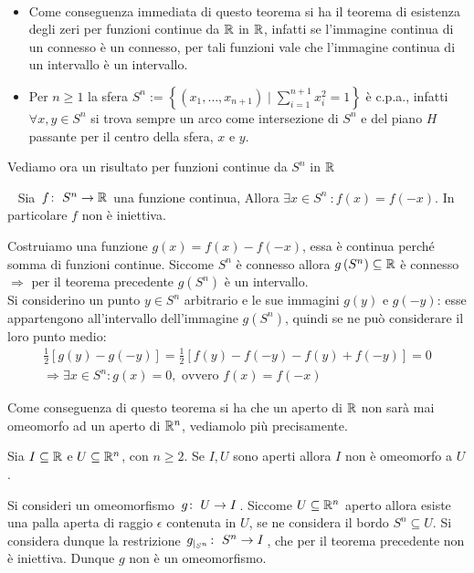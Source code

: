 \begin{observe}~{}\label{teorema esistenza zeri funzioni continue, s^n cpa}
		\begin{itemize}
	\item Come conseguenza immediata di questo teorema si ha il teorema di esistenza degli zeri per funzioni continue da $\mathbb{R}$ in $\mathbb{R}$, infatti se l'immagine continua di un connesso è un connesso, per tali funzioni vale che l'immagine continua di un intervallo è un intervallo.
	\item Per $n\geq 1$ la sfera $S^n := \left\{ \left(x_1,\dots,x_{n+1}\right) \mid \sum_{i=1}^{n+1}x_i^2=1 \right\}$ è c.p.a., infatti $\forall x,y\in S^n$ si trova sempre un arco come intersezione di $S^n$ e del piano $H$ passante per il centro della sfera, $x$ e $y$.
		\end{itemize}
\end{observe}

Vediamo ora un risultato per funzioni continue da $S^n$ in $\mathbb{R}$
\begin{theorema}~{}\label{non iniettività S^n in realset}
	Sia $\funz f {S^n} \realset$ una funzione continua, Allora $\exists x\in S^n \ \colon f(x)=f(-x)$. In particolare $f$ non è iniettiva.
\end{theorema}
\begin{demonstration}
	Costruiamo una funzione $g(x)=f(x)-f(-x)$, essa è continua perché somma di funzioni continue. Siccome $S^n$ è connesso allora $g\left( S^n\right)\subseteq\mathbb{R}$ è connesso $\Rightarrow$ per il teorema precedente $g\left(S^n\right)$ è un intervallo.\\
	Si considerino un punto $y\in S^n$ arbitrario e le sue immagini $g(y)$ e $g(-y)$: esse appartengono all'intervallo dell'immagine $g\left( S^n\right)$, quindi se ne può considerare il loro punto medio:
		\begin{gather*}
			\frac{1}{2}\left[ g(y) - g(-y)\right]=\frac{1}{2} \left[ f(y) -f(-y) - f(y) +f(-y) \right]= 0\\
			\Rightarrow \exists x\in S^n \colon g(x)=0, \text{ ovvero } f(x)=f(-x)
		\end{gather*}
\end{demonstration}


Come conseguenza di questo teorema si ha che un aperto di $\mathbb{R}$ non sarà mai omeomorfo ad un aperto di $\mathbb{R}^n$, vediamolo più precisamente.
\begin{theorema}
Sia $I\subseteq\mathbb{R}$ e $U\subseteq\mathbb{R}^n$, con $n\geq 2$. Se $I,U$ sono aperti allora $I$ non è omeomorfo a $U$.	
\end{theorema}	
\begin{demonstration}
	Si consideri un omeomorfismo $\funz g U I$. Siccome $U\subseteq\mathbb{R}^n$ aperto allora esiste una palla aperta di raggio $\epsilon$ contenuta in $U$, se ne considera il bordo $S^n\subseteq U$. Si considera dunque la restrizione $\funz {g_{|_{S^n}}} {S^n} I$, che per il teorema precedente non è iniettiva. Dunque $g$ non è un omeomorfismo.	
\end{demonstration}


